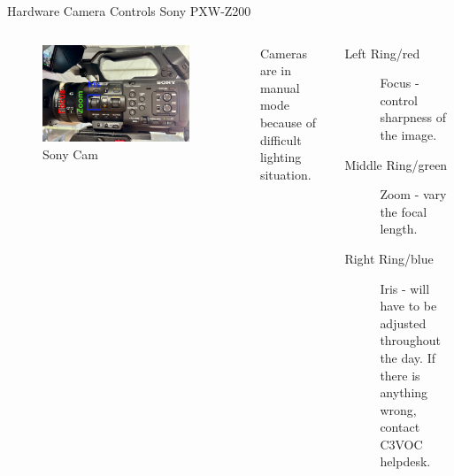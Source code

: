 
\begin{frame}{Hardware Camera Controls Sony PXW-Z200}
	\begin{columns}[T,onlytextwidth]
	\begin{figure}
		\centering
		\includegraphics[width=0.9\textwidth]{images/sony-side-annotated.jpg}
		\caption{Sony Cam}
	\end{figure}
		Cameras are in manual mode because of difficult lighting situation.
		\begin{description}
			\item[Left Ring/red] Focus - control sharpness of the image.
			\item[Middle Ring/green] Zoom - vary the focal length.
			\item[Right Ring/blue] Iris - will have to be adjusted throughout the day. If there is anything wrong, contact C3VOC helpdesk.
		\end{description}
	\end{columns}
\end{frame}


